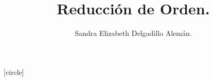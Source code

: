 
\title{Reducción de Orden.}
\author{Sandra Elizabeth Delgadillo Alemán.}

[circle] %
\usepackage{cancel}

\newcommand\Myref[1]{
  \begingroup
  \usebeamerfont*{item projected}%
  \usebeamercolor[bg]{item projected}%
  \begin{pgfpicture}{-1ex}{0ex}{1ex}{2ex}
    \pgfpathcircle{\pgfpoint{0pt}{.75ex}}{1.2ex}
    \pgfusepath{fill}
    \pgftext[base]{\color{fg}\ref{#1}}
  \end{pgfpicture}%
  \endgroup
}
\newcommand{\dis}{\displaystyle} 
